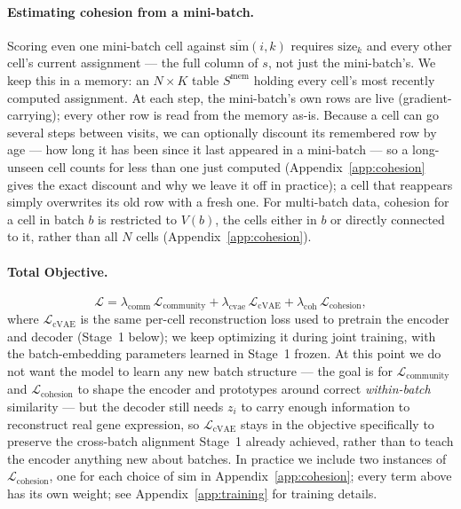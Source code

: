 \paragraph{Estimating cohesion from a mini-batch.}
Scoring even one mini-batch cell against $\overline{\mathrm{sim}}(i,k)$ requires $\mathrm{size}_k$ and every other cell's current assignment --- the full column of $s$, not just the mini-batch's. We keep this in a memory: an $N \times K$ table $S^{\text{mem}}$ holding every cell's most recently computed assignment. At each step, the mini-batch's own rows are live (gradient-carrying); every other row is read from the memory as-is. Because a cell can go several steps between visits, we can optionally discount its remembered row by age --- how long it has been since it last appeared in a mini-batch --- so a long-unseen cell counts for less than one just computed (Appendix~\ref{app:cohesion} gives the exact discount and why we leave it off in practice); a cell that reappears simply overwrites its old row with a fresh one. For multi-batch data, cohesion for a cell in batch $b$ is restricted to $V(b)$, the cells either in $b$ or directly connected to it, rather than all $N$ cells (Appendix~\ref{app:cohesion}).

\paragraph{Total Objective.}
\begin{equation}
\mathcal{L} =
\lambda_{\text{comm}}\, \mathcal{L}_{\text{community}}
+
\lambda_{\text{cvae}}\, \mathcal{L}_{\text{cVAE}}
+
\lambda_{\text{coh}}\, \mathcal{L}_{\text{cohesion}},
\end{equation}
where $\mathcal{L}_{\text{cVAE}}$ is the same per-cell reconstruction loss used to pretrain the encoder and decoder (Stage~1 below); we keep optimizing it during joint training, with the batch-embedding parameters learned in Stage~1 frozen. At this point we do not want the model to learn any new batch structure --- the goal is for $\mathcal{L}_{\text{community}}$ and $\mathcal{L}_{\text{cohesion}}$ to shape the encoder and prototypes around correct \emph{within-batch} similarity --- but the decoder still needs $z_i$ to carry enough information to reconstruct real gene expression, so $\mathcal{L}_{\text{cVAE}}$ stays in the objective specifically to preserve the cross-batch alignment Stage~1 already achieved, rather than to teach the encoder anything new about batches. In practice we include two instances of $\mathcal{L}_{\text{cohesion}}$, one for each choice of $\mathrm{sim}$ in Appendix~\ref{app:cohesion}; every term above has its own weight; see Appendix~\ref{app:training} for training details.

